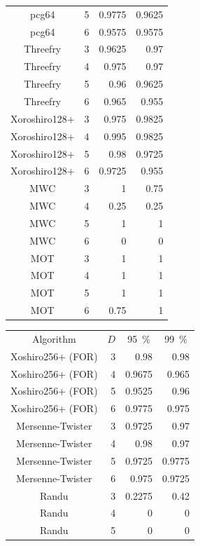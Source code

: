 \begin{table}[H]
\begin{tabular}{c*{3}r}
		pcg64 & 5 & 0.9775 & 0.9625\\ 
		pcg64 & 6 & 0.9575 & 0.9575\\ 
		\cmidrule(lr){1-4}
		Threefry & 3 & 0.9625 & 0.97\\ 
		Threefry & 4 & 0.975 & 0.97\\ 
		Threefry & 5 & 0.96 & 0.9625\\ 
		Threefry & 6 & 0.965 & 0.955\\ 
		\cmidrule(lr){1-4}
		Xoroshiro128+ & 3 & 0.975 & 0.9825\\ 
		Xoroshiro128+ & 4 & 0.995 & 0.9825\\ 
		Xoroshiro128+ & 5 & 0.98 & 0.9725\\ 
		Xoroshiro128+ & 6 & 0.9725 & 0.955\\ 
		\cmidrule(lr){1-4}
		MWC & 3 & 1 & 0.75\\
		MWC & 4 & 0.25 & 0.25\\ 
		MWC & 5 & 1 & 1\\ 
		MWC & 6 & 0 & 0\\ 
		\cmidrule(lr){1-4}
		MOT & 3 & 1 & 1\\ 
		MOT & 4 & 1 & 1\\ 
		MOT & 5 & 1 & 1\\ 
		MOT & 6 & 0.75 & 1\\ 
		\bottomrule 
	\end{tabular}
	\begin{tabular}{c*{3}r}
		\toprule
		Algorithm & \multicolumn{1}{c}{$D$} & \multicolumn{1}{c}{\SI{95}{\percent}} & \multicolumn{1}{c}{\SI{99}{\percent}}\\
		\cmidrule(lr){1-1}
		\cmidrule(lr){2-2}
		\cmidrule(lr){3-3}
		\cmidrule(lr){4-4}
		Xoshiro256+ (FOR) & 3 & 0.98 & 0.98\\ 
		Xoshiro256+ (FOR) & 4 & 0.9675 & 0.965\\ 
		Xoshiro256+ (FOR) & 5 & 0.9525 & 0.96\\ 
		Xoshiro256+ (FOR) & 6 & 0.9775 & 0.975\\
		\cmidrule(lr){1-4} 
		Mersenne-Twister & 3 & 0.9725 & 0.97\\ 
		Mersenne-Twister & 4 & 0.98 & 0.97\\ 
		Mersenne-Twister & 5 & 0.9725 & 0.9775\\ 
		Mersenne-Twister & 6 & 0.975 & 0.9725\\ 
		\cmidrule(lr){1-4}
		Randu & 3 & 0.2275 & 0.42\\ 
		Randu & 4 & 0 & 0\\ 
		Randu & 5 & 0 & 0\\ 

\end{tabular}
\end{table}

